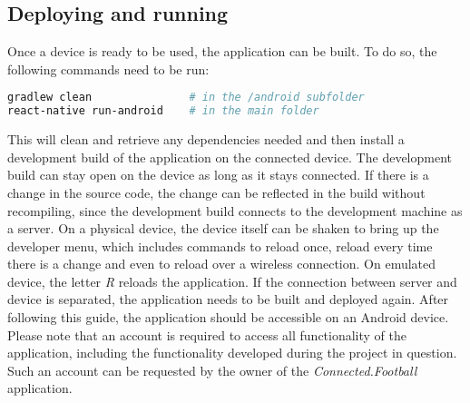 \subsection{Deploying and running}
\label{ssec:deploy}

Once a device is ready to be used, the application can be built. To do so, the following commands need to be run:

\begin{lstlisting}[language=bash,caption=Building and Deploying,label=buildAndDeploy]
gradlew clean               # in the /android subfolder
react-native run-android    # in the main folder
\end{lstlisting}

This will clean and retrieve any dependencies needed and then install a development build of the application on the connected device. The development build can stay open on the device as long as it stays connected. If there is a change in the source code, the change can be reflected in the build without recompiling, since the development build connects to the development machine as a server. On a physical device, the device itself can be shaken to bring up the developer menu, which includes commands to reload once, reload every time there is a change and even to reload over a wireless connection. On emulated device, the letter \textit{R} reloads the application. If the connection between server and device is separated, the application needs to be built and deployed again.
\newline
After following this guide, the application should be accessible on an Android device. Please note that an account is required to access all functionality of the application, including the functionality developed during the project in question. Such an account can be requested by the owner of the \textit{Connected.Football} application.